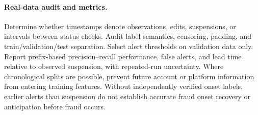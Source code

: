 \paragraph{Real-data audit and metrics.}
Determine whether timestamps denote observations, edits, suspensions, or
intervals between status checks. Audit label semantics, censoring, padding,
and train/validation/test separation. Select alert thresholds on validation
data only. Report prefix-based precision--recall performance, false alerts,
and lead time relative to observed suspension, with repeated-run uncertainty.
Where chronological splits are possible, prevent future account or platform
information from entering training features. Without independently verified
onset labels, earlier alerts than suspension do not establish accurate fraud
onset recovery or anticipation before fraud occurs.

